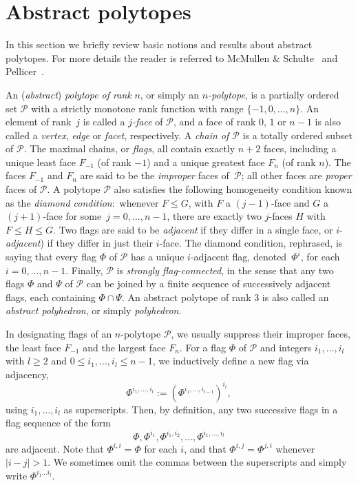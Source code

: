 \documentclass[12pt]{article}
\renewcommand{\>}{\rangle}
\renewcommand{\leq}{\leqslant}
\renewcommand{\geq}{\geqslant}
\theoremstyle{definition}\newtheorem{definition}{Definition}[section]
\begin{document}
\section{Abstract polytopes} 
\label{bano}

In this section we briefly review basic notions and results about abstract polytopes. For more details the reader is referred to McMullen \& Schulte~\cite[Chs. 2,\,3]{MS2002} and Pellicer~\cite{P2025}. 
\smallskip

An (\emph{abstract\/}) \emph{polytope of rank\/} $n$, or simply an \emph{$n$-polytope\/}, is a partially ordered set $\mathcal{P}$ with a strictly monotone rank function with range $\{-1,0, \ldots, n\}$. An element of rank~$j$ is called a \emph{$j$-face\/} of $\mathcal{P}$, and a face of rank $0$, $1$ or $n-1$ is also called a \emph{vertex\/}, \emph{edge\/} or \emph{facet\/}, respectively. A {\em chain of $\mathcal{P}$} is a totally ordered subset of $\mathcal{P}$.  The maximal chains, or \emph{flags}, all contain exactly $n + 2$ faces, including a unique least face $F_{-1}$ (of rank $-1$) and a unique greatest face $F_n$ (of rank $n$). The faces $F_{-1}$ and $F_n$ are said to be the \emph{improper} faces of~$\mathcal{P}$; all other faces are \emph{proper} faces of $\mathcal{P}$. A polytope $\mathcal{P}$ also satisfies the following homogeneity condition known as the {\em diamond condition}:\ whenever $F \leq G$, with $F$ a $(j-1)$-face and $G$ a $(j+1)$-face for some~$j=0,\ldots,n-1$, there are exactly two $j$-faces $H$ with $F \leq H \leq G$. Two flags are said to be \emph{adjacent} if they differ in a single face, or $i$-\emph{adjacent})  if they differ in just their $i$-face. The diamond condition, rephrased,  is saying that every flag $\Phi$ of $\mathcal{P}$ has a unique $i$-adjacent flag, denoted~$\Phi^i$, for each $i=0, \dots, n-1$. Finally, $\mathcal{P}$ is \emph{strongly flag-connected}, in the sense that any two flags $\Phi$ and $\Psi$ of $\mathcal{P}$ can be joined by a finite sequence of successively adjacent flags, each containing $\Phi \cap \Psi$. An abstract polytope of rank 3 is also called an \emph{abstract polyhedron}, or simply \emph{polyhedron}.

In designating flags of an $n$-polytope $\mathcal{P}$, we usually suppress their improper faces, the least face $F_{-1}$ and the largest face $F_n$. For a flag $\Phi$ of $\mathcal{P}$ and integers $i_1,\ldots,i_{l}$ with $l\geq 2$ and $0\leq i_1,\ldots,i_l\leq n-1$, we inductively define a new flag via adjacency,  
\[  \Phi^{i_{1},\ldots,i_{l}}:= (\Phi^{i_{1},\ldots,i_{l-1}})^{i_{l}},\]
using $i_1,\ldots,i_l$ as superscripts. Then, by definition, any two successive flags in a flag sequence of the form 
\[\Phi,\Phi^{i_1},\Phi^{i_{1},i_{2}}, \ldots, \Phi^{i_{1},\ldots,i_{l}}\]  
are adjacent. Note that $\Phi^{i,i} = \Phi$ for each $i$, and that $\Phi^{i,j}=\Phi^{j,i}$ whenever $|i-j|>1$. We sometimes omit the commas between the superscripts and simply write $\Phi^{i_{1}\ldots i_{l}}$.
\end{document}

